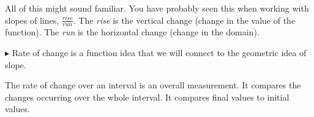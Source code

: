 \documentclass{ximera}
\begin{document}
All of this might sound familiar. You have probably seen this when working with slopes of lines, $\frac{rise}{run}$.  The \textit{rise} is the vertical change (change in the value of the function). The \textit{run} is the horizontal change (change in the domain).

$\blacktriangleright$ Rate of change is a function idea that we will connect to the geometric idea of slope.





The rate of change over an interval is an overall measurement.  It compares the changes occurring over the whole interval. It compares final values to initial values. 
\end{document}
